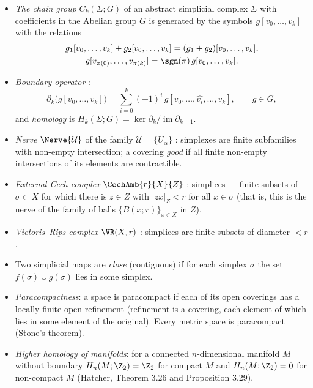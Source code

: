\documentclass[a4paper,12pt]{report}
\begin{document}
\begin{itemize}[leftmargin=*]
\item \emph{The chain group} $C_k(\Sigma; G)$ of an abstract simplicial complex $\Sigma$ with coefficients in the Abelian group $G$ is generated by the symbols $g[v_0, \dots, v_k]$ with the relations
\begin{gather*}
g_1[v_0,\dots,v_k] + g_2[v_0,\dots,v_k] = (g_1+g_2)[v_0,\dots,v_k], \\
g[v_{\pi(0)},\dots,v_{\pi(k)}] = \sgn(\pi)\, g[v_0,\dots,v_k].
\end{gather*}
\item \emph{Boundary operator} \textup{:}
\[
\partial_k\bigl(g[v_0,\dots,v_k]\bigr) = \sum_{i=0}^k (-1)^i\, g[v_0,\dots,\widehat{v_i},\dots,v_k], \qquad g \in G,
\]
and \emph{homology} is $H_k(\Sigma;G) = \ker \partial_k / \operatorname{im} \partial_{k+1}$.
\item \emph{Nerve} $\Nerve{\mathcal U}$ of the family $\mathcal U = \{U_\alpha\}$ \textup{:} simplexes are finite subfamilies with non-empty intersection\textup{;} a covering \emph{good} if all finite non-empty intersections of its elements are contractible.
\item \emph{External Cech complex} $\CechAmb{r}{X}{Z}$ \textup{:} simplices --- finite subsets of $\sigma \subset X$ for which there is $z \in Z$ with $|zx|_Z < r$ for all $x \in \sigma$ \textup{(}that is, this is the nerve of the family of balls $\{B(x;r)\}_{x \in X}$ in $Z$\textup{)}.
\item \emph{Vietoris--Rips complex} $\VR(X,r)$ \textup{:} simplices are finite subsets of diameter $< r$.
\item Two simplicial maps are \emph{close} \textup{(}contiguous\textup{)} if for each simplex $\sigma$ the set $f(\sigma) \cup g(\sigma)$ lies in some simplex.
\item \emph{Paracompactness}\textup{:} a space is paracompact if each of its open coverings has a locally finite open refinement \textup{(}refinement is a covering, each element of which lies in some element of the original\textup{)}. Every metric space is paracompact \textup{(}Stone's theorem\textup{)}.
\item \emph{Higher homology of manifolds}\textup{:} for a connected $n$-dimensional manifold $M$ without boundary $H_n(M;\Z_2) = \Z_2$ for compact $M$ and $H_n(M;\Z_2) = 0$ for non-compact $M$ \textup{(}Hatcher, Theorem \textup{3.26} and Proposition \textup{3.29}\textup{)}.
\end{itemize}
\end{document}
